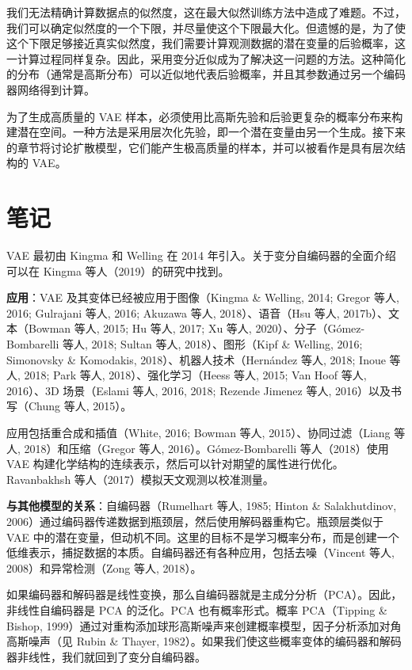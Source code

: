 \documentclass[lang=cn,newtx,10pt,scheme=chinese]{elegantbook}
\begin{document}
我们无法精确计算数据点的似然度，这在最大似然训练方法中造成了难题。不过，我们可以确定似然度的一个下限，并尽量使这个下限最大化。但遗憾的是，为了使这个下限足够接近真实似然度，我们需要计算观测数据的潜在变量的后验概率，这一计算过程同样复杂。因此，采用变分近似成为了解决这一问题的方法。这种简化的分布（通常是高斯分布）可以近似地代表后验概率，并且其参数通过另一个编码器网络得到计算。

为了生成高质量的 VAE 样本，必须使用比高斯先验和后验更复杂的概率分布来构建潜在空间。一种方法是采用层次化先验，即一个潜在变量由另一个生成。接下来的章节将讨论扩散模型，它们能产生极高质量的样本，并可以被看作是具有层次结构的 VAE。


\section{笔记}
VAE 最初由 Kingma 和 Welling 在 2014 年引入。关于变分自编码器的全面介绍可以在 Kingma 等人（2019）的研究中找到。

\textbf{应用}：VAE 及其变体已经被应用于图像（Kingma \& Welling, 2014; Gregor 等人, 2016; Gulrajani 等人, 2016; Akuzawa 等人, 2018）、语音（Hsu 等人, 2017b）、文本（Bowman 等人, 2015; Hu 等人, 2017; Xu 等人, 2020）、分子（Gómez-Bombarelli 等人, 2018; Sultan 等人, 2018）、图形（Kipf \& Welling, 2016; Simonovsky \& Komodakis, 2018）、机器人技术（Hernández 等人, 2018; Inoue 等人, 2018; Park 等人, 2018）、强化学习（Heess 等人, 2015; Van Hoof 等人, 2016）、3D 场景（Eslami 等人, 2016, 2018; Rezende Jimenez 等人, 2016）以及书写（Chung 等人, 2015）。

应用包括重合成和插值（White, 2016; Bowman 等人, 2015）、协同过滤（Liang 等人, 2018）和压缩（Gregor 等人, 2016）。Gómez-Bombarelli 等人（2018）使用 VAE 构建化学结构的连续表示，然后可以针对期望的属性进行优化。Ravanbakhsh 等人（2017）模拟天文观测以校准测量。

\textbf{与其他模型的关系}：自编码器（Rumelhart 等人, 1985; Hinton \& Salakhutdinov, 2006）通过编码器传递数据到瓶颈层，然后使用解码器重构它。瓶颈层类似于 VAE 中的潜在变量，但动机不同。这里的目标不是学习概率分布，而是创建一个低维表示，捕捉数据的本质。自编码器还有各种应用，包括去噪（Vincent 等人, 2008）和异常检测（Zong 等人, 2018）。

如果编码器和解码器是线性变换，那么自编码器就是主成分分析（PCA）。因此，非线性自编码器是 PCA 的泛化。PCA 也有概率形式。概率 PCA（Tipping \& Bishop, 1999）通过对重构添加球形高斯噪声来创建概率模型，因子分析添加对角高斯噪声（见 Rubin \& Thayer, 1982）。如果我们使这些概率变体的编码器和解码器非线性，我们就回到了变分自编码器。
\end{document}
